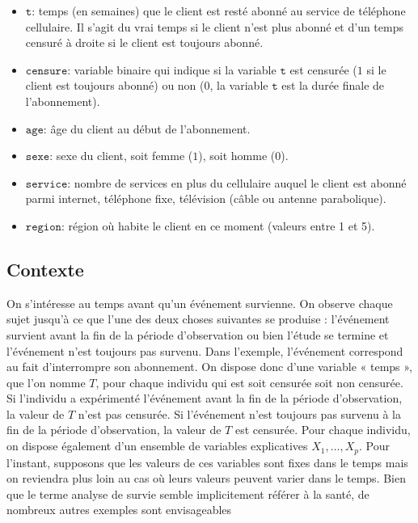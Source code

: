 \documentclass[
  11pt,
  letterpaper,
]{book}
\providecommand{\tightlist}{%
  \setlength{\itemsep}{0pt}\setlength{\parskip}{0pt}}
\theoremstyle{definition}
\theoremstyle{definition}
\theoremstyle{definition}
\theoremstyle{remark}
\begin{document}
\begin{itemize}
\tightlist
\item
  \(\texttt{t}\): temps (en semaines) que le client est resté abonné au service de téléphone cellulaire. Il s'agit du vrai temps si le client n'est plus abonné et d'un temps censuré à droite si le client est toujours abonné.
\item
  \(\texttt{censure}\): variable binaire qui indique si la variable \(\texttt{t}\) est censurée (\(1\) si le client est toujours abonné) ou non (\(0\), la variable \(\texttt{t}\) est la durée finale de l'abonnement).
\item
  \(\texttt{age}\): âge du client au début de l'abonnement.
\item
  \(\texttt{sexe}\): sexe du client, soit femme (\(1\)), soit homme (\(0\)).
\item
  \(\texttt{service}\): nombre de services en plus du cellulaire auquel le client est abonné parmi internet, téléphone fixe, télévision (câble ou antenne parabolique).
\item
  \(\texttt{region}\): région où habite le client en ce moment (valeurs entre 1 et 5).
\end{itemize}

\hypertarget{contexte}{%
\subsection{Contexte}\label{contexte}}

On s'intéresse au temps avant qu'un événement survienne. On observe chaque sujet jusqu'à ce que l'une des deux choses suivantes se produise : l'événement survient avant la fin de la période d'observation ou bien l'étude se termine et l'événement n'est toujours pas survenu. Dans l'exemple, l'événement correspond au fait d'interrompre son abonnement. On dispose donc d'une variable « temps », que l'on nomme \(T\), pour chaque individu qui est soit censurée soit non censurée. Si l'individu a expérimenté l'événement avant la fin de la période d'observation, la valeur de \(T\) n'est pas censurée. Si l'événement n'est toujours pas survenu à la fin de la période d'observation, la valeur de \(T\) est censurée. Pour chaque individu, on dispose également d'un ensemble de variables explicatives \(X_1, \ldots, X_p\). Pour l'instant, supposons que les valeurs de ces variables sont fixes dans le temps mais on reviendra plus loin au cas où leurs valeurs peuvent varier dans le temps. Bien que le terme analyse de survie semble implicitement référer à la santé, de nombreux autres exemples sont envisageables
\end{document}
